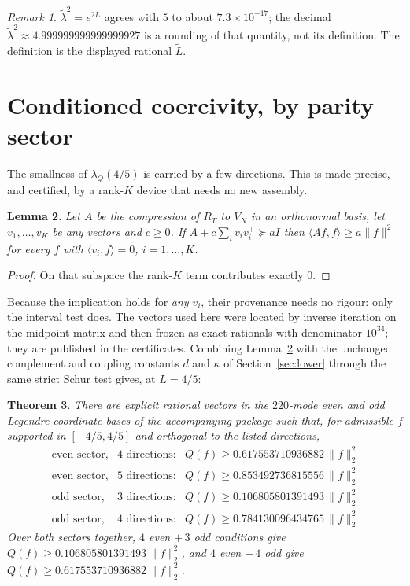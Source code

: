 \documentclass[11pt,a4paper]{article}
\newtheorem{theorem}{Theorem}
\newtheorem{lemma}[theorem]{Lemma}
\theoremstyle{definition}
\theoremstyle{remark}
\newtheorem{remark}[theorem]{Remark}
\newcommand{\lQ}{\lambda_{Q}}
\begin{document}
\begin{remark}
$\widetilde\lambda^2 = e^{2\widetilde L}$ agrees with $5$ to about
$7.3\times10^{-17}$; the decimal $\widetilde\lambda^2 \approx 4.999999999999999927$
is a rounding of that
quantity, not its definition. The definition is the displayed rational
$\widetilde L$.
\end{remark}

\section{Conditioned coercivity, by parity sector}
\label{sec:cond}

The smallness of $\lQ(4/5)$ is carried by a few directions. This is made
precise, and certified, by a rank-$K$ device that needs no new assembly.

\begin{lemma}
\label{lem:bump}
Let $A$ be the compression of $R_T$ to $V_N$ in an orthonormal basis, let
$v_1,\dots,v_K$ be any vectors and $c \ge 0$. If
$A + c\sum_{i} v_i v_i^{\!\top} \succeq a I$ then
$\langle A f, f\rangle \ge a\|f\|^2$ for every $f$ with
$\langle v_i, f\rangle = 0$, $i = 1,\dots,K$.
\end{lemma}

\begin{proof}
On that subspace the rank-$K$ term contributes exactly $0$.
\end{proof}

Because the implication holds for \emph{any} $v_i$, their provenance needs no
rigour: only the interval test does. The vectors used here were located by
inverse iteration on the midpoint matrix and then frozen as exact rationals with
denominator $10^{34}$; they are published in the certificates. Combining
Lemma~\ref{lem:bump} with the unchanged complement and coupling constants
$d$ and $\kappa$ of Section~\ref{sec:lower} through the same strict Schur test
gives, at $L = 4/5$:

\begin{theorem}
\label{thm:cond}
There are explicit rational vectors in the $220$-mode even and odd Legendre
coordinate bases of the accompanying package such that, for admissible $f$
supported in $[-4/5,4/5]$ and orthogonal to the listed directions,
\[
\begin{array}{llr}
\text{even sector,} & 4 \text{ directions:} & Q(f) \ge 0.617553710936882\,\|f\|_2^2 \\
\text{even sector,} & 5 \text{ directions:} & Q(f) \ge 0.853492736815556\,\|f\|_2^2 \\
\text{odd sector,}  & 3 \text{ directions:} & Q(f) \ge 0.106805801391493\,\|f\|_2^2 \\
\text{odd sector,}  & 4 \text{ directions:} & Q(f) \ge 0.784130096434765\,\|f\|_2^2
\end{array}
\]
Over both sectors together, $4$ even $+\,3$ odd conditions give
$Q(f) \ge 0.106805801391493\,\|f\|_2^2$, and $4$ even $+\,4$ odd give
$Q(f) \ge 0.617553710936882\,\|f\|_2^2$.
\end{theorem}
\end{document}
